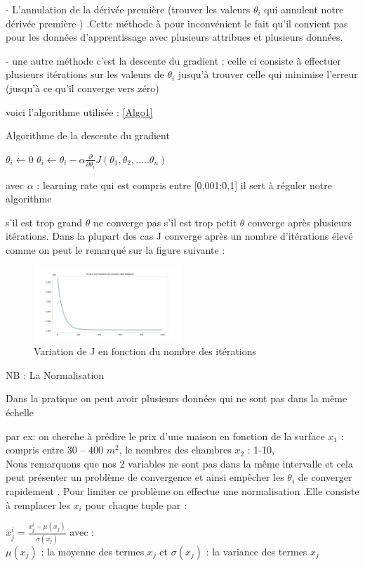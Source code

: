   - L'annulation de la dérivée première (trouver les valeurs ${\theta }_{i}$ qui annulent notre dérivée première  ) .Cette méthode à pour inconvénient le fait qu'il convient pas pour les données d'apprentissage avec plusieurs attribues et plusieurs données. 
  
  - une autre méthode c'est la descente du gradient :
  celle ci consiste à effectuer plusieurs itérations sur les valeurs de  ${\theta }_{i}$ jusqu'à trouver celle qui minimise l'erreur (jusqu'à ce qu'il converge vers zéro)
  
  voici l'algorithme utilisée :
\ref{Algo1}
\begin{algorithm}[ht]
	\caption{Algorithme de la descente du gradient }
	\label{Algo1}
	\begin{algorithmic}
		\State ${\theta }_{i} \leftarrow 0$
		\State ${\theta }_{i} \leftarrow  {\theta }_{i} - \alpha \frac{\partial }{\partial {{\theta }_{i}}}J\left({\theta }_{1},{\theta }_{2},.....{\theta }_{n}\right)$
		\EndWhile
	\end{algorithmic}
   \end{algorithm}
  
  avec $\alpha$ : learning rate qui est compris entre [0,001;0,1] il sert à réguler notre algorithme
  
  s'il est trop grand $\theta$ ne converge pas
  s'il est trop petit $\theta$ converge après plusieurs itérations. 
  Dans la plupart des cas J converge après un nombre d'itérations élevé
  comme on peut le remarqué sur la figure suivante :
  \begin{figure}[ht]
  	\centering
  	\includegraphics[width=0.5\textwidth]{fig/Cost_vs_iterations.png}
  	\caption{Variation de J en fonction du nombre des itérations}
  	\label{fig:image3}
  \end{figure}
   
  
  NB :  La Normalisation
  
  Dans la pratique on peut avoir plusieurs données qui ne sont pas dans la même échelle
  
  par ex: on cherche à prédire le prix d'une maison en fonction de la surface ${x}_{1}$ : compris entre 30 -- 400 ${m}^2$, le nombres des chambres ${x}_{2}$ : 1-10,\\
    Nous remarquons que nos 2 variables ne sont pas dans la même intervalle et  cela peut présenter un problème de convergence et ainsi empêcher les ${\theta }_{i}$ de converger rapidement .
   Pour limiter ce problème on effectue une normalisation .Elle consiste à remplacer les ${x}_{i}$ pour chaque tuple par :
   
        ${x}_{j}^{i} =  \frac{{x}_{j}^{i}- {\mu({x}_{j})}}{{\sigma({x}_{j})}}$
        avec : \\
        ${\mu({x}_{j})}$ : la moyenne des termes  ${x}_{j}$ et 
        ${\sigma({x}_{j})}$ : la variance des termes  ${x}_{j}$ 
        